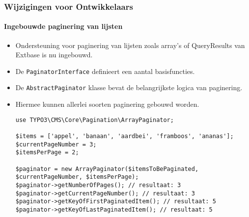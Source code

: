 
\begin{frame}[fragile]
	\frametitle{Wijzigingen voor Ontwikkelaars}
	\framesubtitle{Ingebouwde paginering van lijsten}

	\lstset{basicstyle=\tiny\ttfamily}

	\begin{itemize}
		\item Ondersteuning voor paginering van lijsten zoals array's of QueryResults van Extbase is nu ingebouwd.
		\item De \texttt{PaginatorInterface} definieert een aantal basisfuncties.
		\item De \texttt{AbstractPaginator} klasse bevat de belangrijkste logica van paginering.
		\item Hiermee kunnen allerlei soorten paginering gebouwd worden.
\begin{lstlisting}
use TYPO3\CMS\Core\Pagination\ArrayPaginator;

$items = ['appel', 'banaan', 'aardbei', 'framboos', 'ananas'];
$currentPageNumber = 3;
$itemsPerPage = 2;

$paginator = new ArrayPaginator($itemsToBePaginated, $currentPageNumber, $itemsPerPage);
$paginator->getNumberOfPages(); // resultaat: 3
$paginator->getCurrentPageNumber(); // resultaat: 3
$paginator->getKeyOfFirstPaginatedItem(); // resultaat: 5
$paginator->getKeyOfLastPaginatedItem(); // resultaat: 5
\end{lstlisting}

	\end{itemize}

\end{frame}


